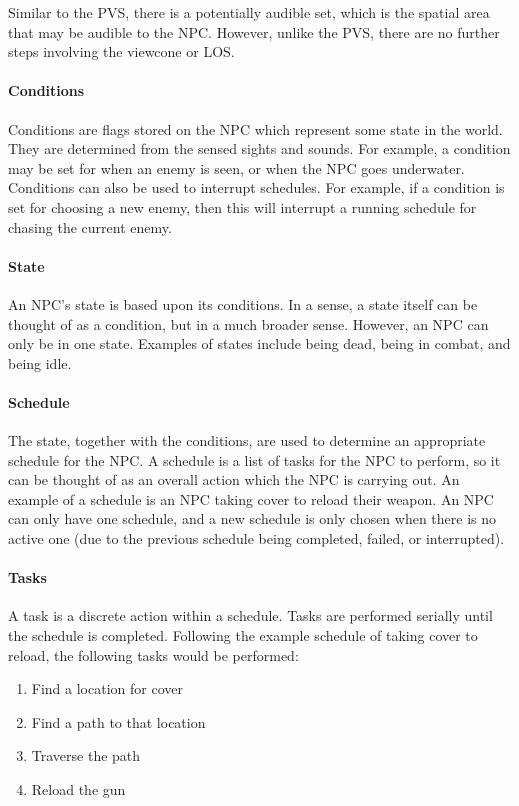 \documentclass[a4paper, 12pt]{scrartcl}
\begin{document}
Similar to the PVS, there is a potentially audible set, which is the spatial area that may be audible to the NPC. However, unlike the PVS, there are no further steps involving the viewcone or LOS.

\paragraph{Conditions}
Conditions are flags stored on the NPC which represent some state in the world. They are determined from the sensed sights and sounds. For example, a condition may be set for when an enemy is seen, or when the NPC goes underwater. Conditions can also be used to interrupt schedules. For example, if a condition is set for choosing a new enemy, then this will interrupt a running schedule for chasing the current enemy.

\paragraph{State}
An NPC's state is based upon its conditions. In a sense, a state itself can be thought of as a condition, but in a much broader sense. However, an NPC can only be in one state. Examples of states include being dead, being in combat, and being idle.

\paragraph{Schedule}
The state, together with the conditions, are used to determine an appropriate schedule for the NPC. A schedule is a list of tasks for the NPC to perform, so it can be thought of as an overall action which the NPC is carrying out. An example of a schedule is an NPC taking cover to reload their weapon. An NPC can only have one schedule, and a new schedule is only chosen when there is no active one (due to the previous schedule being completed, failed, or interrupted).

\paragraph{Tasks}
A task is a discrete action within a schedule. Tasks are performed serially until the schedule is completed. Following the example schedule of taking cover to reload, the following tasks would be performed:

\begin{enumerate}
  \item Find a location for cover
  \item Find a path to that location
  \item Traverse the path
  \item Reload the gun
\end{enumerate}
\end{document}
